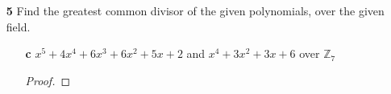 \documentclass[paper=usletter, fontsize=12pt]{article}
\begin{document}
\begin{enumerate}
\begin{enumerate}
\begin{enumerate}
\begin{proof}
\begin{center}
                        \\

                    \end{center}

                    Multiplying the remainder with a non-zero constant keeps it
                    unchanged, and therefore,
                    \begin{align*}
                        \text{remainder} &= \bigg(\frac{3}{4}x^2+\frac{3}{4}x+\frac{3}{4}\bigg)\frac{4}{3}\\
                        & = x^2+x+1
                    \end{align*}
                    Thus,
                    \begin{align*}
                        \gcd(x^4+2x^3+3x^2+2x+1,4x^3+6x^2+6x+2) \\ = \gcd(4x^3+6x^2+6x+2,x^2+x+1)
                    \end{align*}
                    Dividing as before,\\
                    \begin{center}

                        \\

                    \end{center}
                    Therefore,
                    \begin{equation*}
                        \gcd(x^4+2x^3+3x^2+2x+1,4x^3+6x^2+6x+2) = x^2+x+1 \qedhere
                    \end{equation*}

                \end{proof}

            \end{enumerate}

            \item[\textbf{5}] Find the greatest common divisor of the given
            polynomials, over the given field.
            \begin{enumerate}

                \item[\textbf{c}] $x^5+4x^4+6x^3+6x^2+5x+2$ and $x^4+3x^2+3x+6$
                over $\mathbb{Z}_7$
                \begin{proof}


\end{proof}
\end{enumerate}
\end{enumerate}
\end{enumerate}
\end{document}
